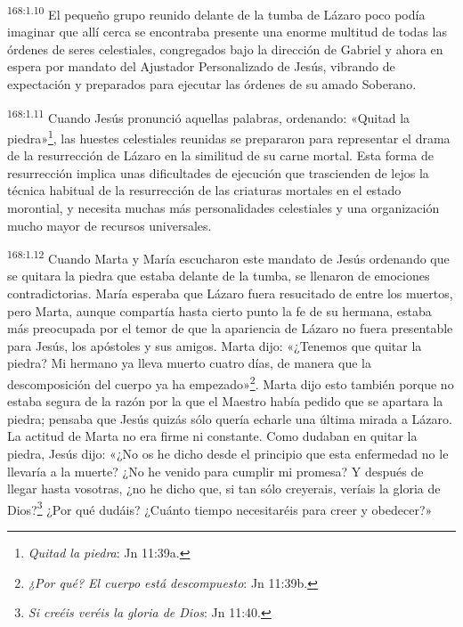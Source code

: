 \par 
\textsuperscript{168:1.10} El pequeño grupo reunido delante de la tumba de Lázaro poco podía imaginar que allí cerca se encontraba presente una enorme multitud de todas las órdenes de seres celestiales, congregados bajo la dirección de Gabriel y ahora en espera por mandato del Ajustador Personalizado de Jesús, vibrando de expectación y preparados para ejecutar las órdenes de su amado Soberano.

\par 
\textsuperscript{168:1.11} Cuando Jesús pronunció aquellas palabras, ordenando: «Quitad la piedra»\footnote{\textit{Quitad la piedra}: Jn 11:39a.}, las huestes celestiales reunidas se prepararon para representar el drama de la resurrección de Lázaro en la similitud de su carne mortal. Esta forma de resurrección implica unas dificultades de ejecución que trascienden de lejos la técnica habitual de la resurrección de las criaturas mortales en el estado morontial, y necesita muchas más personalidades celestiales y una organización mucho mayor de recursos universales.

\par 
\textsuperscript{168:1.12} Cuando Marta y María escucharon este mandato de Jesús ordenando que se quitara la piedra que estaba delante de la tumba, se llenaron de emociones contradictorias. María esperaba que Lázaro fuera resucitado de entre los muertos, pero Marta, aunque compartía hasta cierto punto la fe de su hermana, estaba más preocupada por el temor de que la apariencia de Lázaro no fuera presentable para Jesús, los apóstoles y sus amigos. Marta dijo: «¿Tenemos que quitar la piedra? Mi hermano ya lleva muerto cuatro días, de manera que la descomposición del cuerpo ya ha empezado»\footnote{\textit{¿Por qué? El cuerpo está descompuesto}: Jn 11:39b.}. Marta dijo esto también porque no estaba segura de la razón por la que el Maestro había pedido que se apartara la piedra; pensaba que Jesús quizás sólo quería echarle una última mirada a Lázaro. La actitud de Marta no era firme ni constante. Como dudaban en quitar la piedra, Jesús dijo: «¿No os he dicho desde el principio que esta enfermedad no le llevaría a la muerte? ¿No he venido para cumplir mi promesa? Y después de llegar hasta vosotras, ¿no he dicho que, si tan sólo creyerais, veríais la gloria de Dios?\footnote{\textit{Si creéis veréis la gloria de Dios}: Jn 11:40.} ¿Por qué dudáis? ¿Cuánto tiempo necesitaréis para creer y obedecer?»

